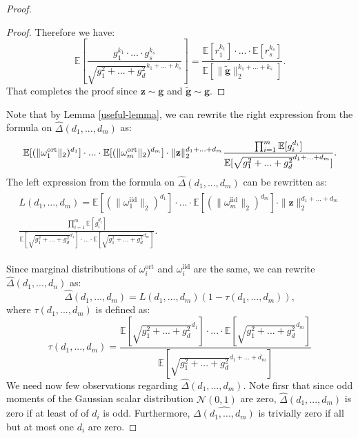 \begin{proof}
\begin{proof}
Therefore we have:
\begin{equation}
 \mathbb{E}[\frac{g_{1}^{k_{1}} \cdot ... \cdot g_{s}^{k_{s}}}{\sqrt{g_{1}^{2}+...+g_{d}^{2}}^{k_{1}+...+k_{s}}}] = \frac{\mathbb{E}[r_{1}^{k_{1}}] \cdot ... \cdot     \mathbb{E}[r_{s}^{k_{s}}]}{\mathbb{E}[\|\tilde{\mathbf{g}}\|_{2}^{k_{1}+...+k_{s}}]}.   
\end{equation}
That completes the proof since $\mathbf{z} \sim \mathbf{g}$ and $\tilde{\mathbf{g}} \sim \mathbf{g}$.
\end{proof}

Note that by Lemma \ref{useful-lemma}, we can rewrite the right expression from the formula on 
$\widehat{\Delta}(d_1,..., d_m)$
as: 
\begin{equation}
\mathbb{E}[(\|\omega_{1}^{\mathrm{ort}}\|_{2})^{d_{1}}] \cdot ... \cdot \mathbb{E}[(\|\omega_{m}^{\mathrm{ort}}\|_{2})^{d_{m}}] \cdot \\
\|\mathbf{z}\|_{2}^{d_{1}+...+d_{m}}\frac{\prod_{i=1}^{m}\mathbb{E}[g_{i}^{d_{i}}]}{\mathbb{E}[\sqrt{g_{1}^{2}+...+g_{d}^{2}}^{d_{1}+...+d_{m}}]}.
\end{equation}
The left expression from the formula on 
$\widehat{\Delta}(d_1,..., d_m)$ can be rewritten as:
\begin{align}
\begin{split}
L(d_{1},...,d_{m}) = \mathbb{E}[(\|\omega_{1}^{\mathrm{iid}}\|_{2})^{d_{1}}] \cdot ... \cdot \mathbb{E}[(\|\omega_{m}^{\mathrm{iid}}\|_{2})^{d_{m}}] \cdot 
\|\mathbf{z}\|_{2}^{d_{1}+...+d_{m}} \\
\frac{\prod_{i=1}^{m}\mathbb{E}[g_{i}^{d_{i}}]}
{\mathbb{E}[\sqrt{g_{1}^{2}+...+g_{d}^{2}}^{d_{1}}] \cdot ...\cdot \mathbb{E}[\sqrt{g_{1}^{2}+...+g_{d}^{2}}^{d_{m}}]}.
\end{split}
\end{align}

Since marginal distributions of $\omega_{i}^{\mathrm{ort}}$ and $\omega_{i}^{\mathrm{iid}}$ are the same, we can rewrite $\widehat{\Delta}(d_{1},...,d_{n})$ as:
\begin{equation}
\widehat{\Delta}(d_{1},...,d_{m})=
L(d_{1},...,d_{m})(1 - \tau(d_{1},...,d_{m})),
\end{equation}
where $\tau(d_{1},...,d_{m})$ is defined as:
\begin{equation}
\tau(d_{1},...,d_{m}) = \frac{\mathbb{E}[\sqrt{g_{1}^{2}+...+g_{d}^{2}}^{d_{1}}] \cdot ...\cdot \mathbb{E}[\sqrt{g_{1}^{2}+...+g_{d}^{2}}^{d_{m}}]}
{\mathbb{E}[\sqrt{g_{1}^{2}+...+g_{d}^{2}}^{d_{1}+...+d_{m}}]}    \label{eq:taudef} 
\end{equation}
We need now few observations regarding $\widehat{\Delta}(d_{1},...,d_{m})$.
Note firsr that since odd moments of the Gaussian scalar distribution $\mathcal{N}(0, 1)$ are zero, $\widehat{\Delta}(d_{1},...,d_{m})$ is zero if at least of of $d_{i}$ is odd. Furthermore, $\widehat{\Delta(d_{1},...,d_{m})}$ is trivially zero if all but at most one $d_{i}$ are zero.


\end{proof}
